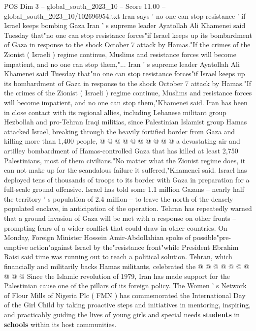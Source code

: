 \begin{textsample}{POS Dim 3 – global\_south\_2023\_10 – Score 11.00 – global\_south\_2023\_10/102696954.txt}  \label{ex:f3_pos_429}
Iran says ' no one can stop resistance ' if Israel keeps bombing Gaza Iran ' s supreme leader Ayatollah Ali Khamenei said Tuesday that"no one can stop resistance forces"if Israel keeps up its bombardment of Gaza in response to the shock October 7 attack by Hamas."If the crimes of the Zionist ( Israeli ) regime continue, Muslims and resistance forces will become impatient, and no one can stop them,"...
Iran ' s supreme leader Ayatollah Ali Khamenei said Tuesday that"no one can stop resistance forces"if Israel keeps up its bombardment of Gaza in response to the shock October 7 attack by Hamas."If the crimes of the Zionist ( Israeli ) regime continue, Muslims and resistance forces will become impatient, and no one can stop them,"Khamenei said.
Iran has been in close contact with its regional allies, including Lebanese militant group Hezbollah and pro-Tehran Iraqi militias, since Palestinian Islamist group Hamas attacked Israel, breaking through the heavily fortified border from Gaza and killing more than 1,400 people, @ @ @ @ @ @ @ @ @ @ a devastating air and artilley bombardment of Hamas-controlled Gaza that has killed at least 2,750 Palestinians, most of them civilians."No matter what the Zionist regime does, it can not make up for the scandalous failure it suffered,"Khamenei said.
Israel has deployed tens of thousands of troops to its border with Gaza in preparation for a full-scale ground offensive.
Israel has told some 1.1 million Gazans -- nearly half the territory ' s population of 2.4 million -- to leave the north of the densely populated enclave, in anticipation of the operation.
Tehran has repeatedly warned that a ground invasion of Gaza will be met with a response on other fronts -- prompting fears of a wider conflict that could draw in other countries.
On Monday, Foreign Minister Hossein Amir-Abdollahian spoke of possible"pre-emptive action"against Israel by the"resistance front"while President Ebrahim Raisi said time was running out to reach a political solution.
Tehran, which financially and militarily backs Hamas militants, celebrated the @ @ @ @ @ @ @ @ @ @ Since the Islamic revolution of 1979, Iran has made support for the Palestinian cause one of the pillars of its foreign policy.
The Women ' s Network of Flour Mills of Nigeria Plc ( FMN ) has commemorated the International Day of the Girl Child by taking proactive steps and initiatives in mentoring, inspiring, and practicably guiding the lives of young girls and special needs \textbf{students} in \textbf{schools} within its host communities.

\end{textsample}
